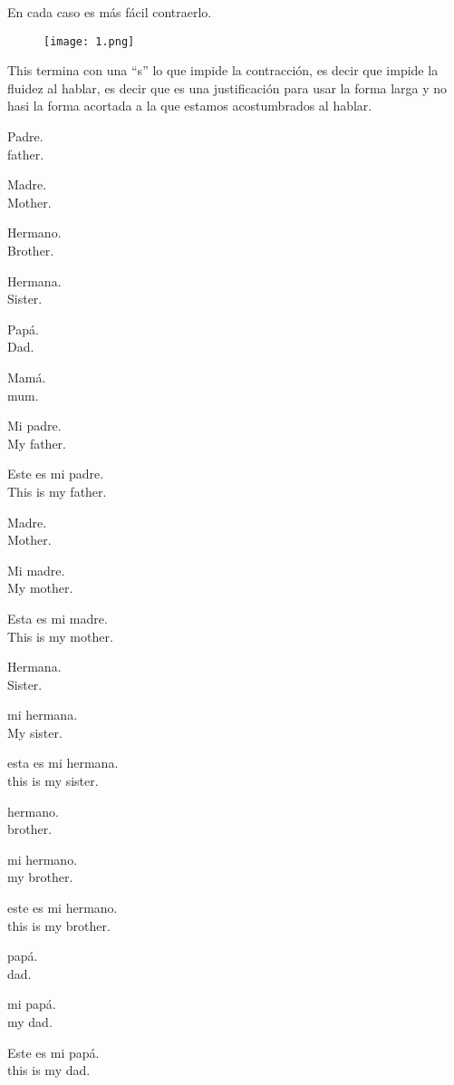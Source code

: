 En cada caso es más fácil contraerlo.

\begin{figure}[H]
\centering
\texttt{[image: 1.png]}
\end{figure}

This termina con una ``s'' lo que impide la contracción,  es decir que
impide la fluidez al hablar, es decir que es una justificación para usar
la forma larga y no hasi la forma acortada a la que estamos acostumbrados al
hablar.

Padre.\\
father.

Madre.\\
Mother.

Hermano.\\
Brother.

Hermana.\\
Sister.

Papá.\\
Dad.

Mamá.\\
mum.

Mi padre.\\
My father.

Este es mi padre.\\
This is my father.

Madre.\\
Mother.

Mi madre.\\
My mother.

Esta es mi madre.\\
This is my mother.

Hermana.\\
Sister.

mi hermana.\\
My sister.

esta es mi hermana.\\
this is my sister.

hermano.\\
brother.

mi hermano.\\
my brother.

este es mi hermano.\\
this is my brother.

papá.\\
dad.

mi papá.\\
my dad.

Este es mi papá.\\
this is my dad.

